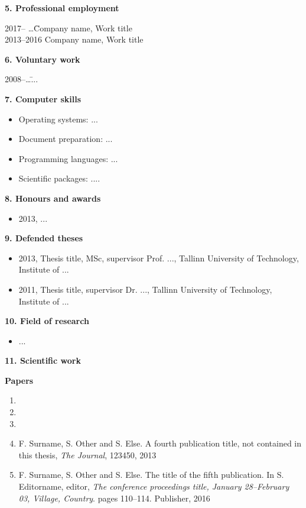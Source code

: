 \textbf{5. Professional employment}
\begin{tabbing}
2017-- \ldots \quad\quad \= Company name, Work title \\
2013--2016  \> Company name, Work title \\
\end{tabbing}


\textbf{6. Voluntary work}
\begin{tabbing}
2008--\ldots \quad\quad \= ... \\
\end{tabbing}

\textbf{7. Computer skills}
\begin{itemize}
\item Operating systems: ...
\item Document preparation: ...
\item Programming languages: ...
\item Scientific packages: ....
\end{itemize}
\newpage


\textbf{8. Honours and awards}
\begin{itemize}
\item 2013, ...
\end{itemize}   

\textbf{9. Defended theses} 
\begin{itemize}

\item 2013, Thesis title, MSc, supervisor Prof. ..., Tallinn University of Technology, Institute of ...
\item 2011, Thesis title, supervisor Dr. ..., Tallinn University of Technology, Institute of ...
\end{itemize}


\textbf{10. Field of research} 
\begin{itemize}
\item ...
\end{itemize}

\textbf{11. Scientific work}


\textbf{Papers}
\begin{enumerate}
\item {}
\item {}
\item {}
\item F. Surname, S. Other and S. Else. A fourth publication title, not contained in this thesis, \textit{The Journal}, 123450, 2013

\item F. Surname, S. Other and S. Else. The title of the fifth publication. In S. Editorname, editor, \textit{The conference proceedings title, January 28--February 03, Village, Country}. pages 110--114. Publisher, 2016

\end{enumerate}



